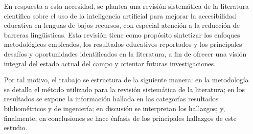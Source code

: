 En respuesta a esta necesidad, se plantea una revisión sistemática de la literatura científica sobre el uso de la inteligencia artificial para mejorar la accesibilidad educativa en lenguas de bajos recursos, con especial atención a la reducción de barreras lingüísticas. Esta revisión tiene como propósito sintetizar los enfoques metodológicos empleados, los resultados educativos reportados y los principales desafíos y oportunidades identificados en la literatura, a fin de ofrecer una visión integral del estado actual del campo y orientar futuras investigaciones.

Por tal motivo, el trabajo se estructura de la siguiente manera: en la metodología se detalla el método utilizado para la revisión sistemática de la literatura; en los resultados se expone la información hallada en las categorías resultados bibliométricos y de ingeniería; en discusión se interpretan los hallazgos; y, finalmente, en conclusiones se hace énfasis de los principales hallazgos de este estudio.
